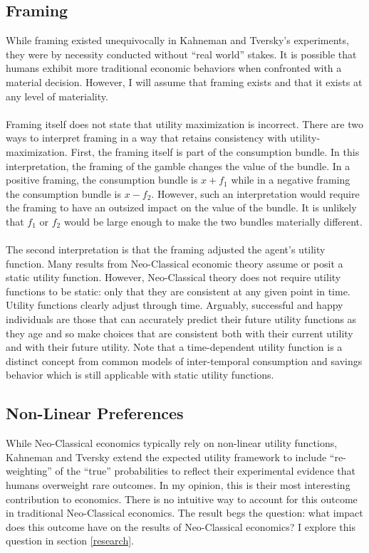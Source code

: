 \documentclass{article}
\theoremstyle{definition}
\begin{document}
\subsection{Framing}

While framing existed unequivocally in Kahneman and Tversky's experiments, they were by necessity conducted without ``real world'' stakes.  It is possible that humans exhibit more traditional economic behaviors when confronted with a material decision.  However, I will assume that framing exists and that it exists at any level of materiality.  
\\
\\
Framing itself does not state that utility maximization is incorrect.  There are two ways to interpret framing in a way that retains consistency with utility-maximization.  First, the framing itself is part of the consumption bundle.  In this interpretation, the framing of the gamble changes the value of the bundle.  In a positive framing, the consumption bundle is \(x+f_1\) while in a negative framing the consumption bundle is \(x-f_2\).  However, such an interpretation would require the framing to have an outsized impact on the value of the bundle.  It is unlikely that \(f_1\) or \(f_2\) would be large enough to make the two bundles materially different.  
\\
\\
The second interpretation is that the framing adjusted the agent's utility function.  Many results from Neo-Classical economic theory assume or posit a static utility function.  However, Neo-Classical theory does not require utility functions to be static: only that they are consistent at any given point in time.  Utility functions clearly adjust through time.  Arguably, successful and happy individuals are those that can accurately predict their future utility functions as they age and so make choices that are consistent both with their current utility and with their future utility.  Note that a time-dependent utility function is a distinct concept from common models of inter-temporal consumption and savings behavior which is still applicable with static utility functions.

\subsection{Non-Linear Preferences}
While Neo-Classical economics typically rely on non-linear utility functions, Kahneman and Tversky extend the expected utility framework to include ``re-weighting'' of the ``true'' probabilities to reflect their experimental evidence that humans overweight rare outcomes.  In my opinion, this is their most interesting contribution to economics.  There is no intuitive way to account for this outcome in traditional Neo-Classical economics.  The result begs the question: what impact does this outcome have on the results of Neo-Classical economics?  I explore this question in section \ref{research}.  
\end{document}
